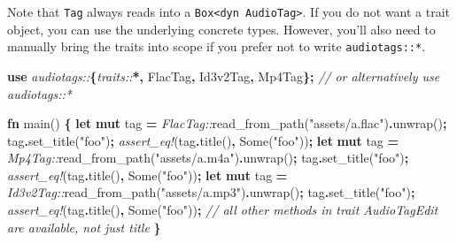 \documentclass[
]{book}
\newenvironment{Shaded}{\begin{snugshade}}{\end{snugshade}}
\newcommand{\CommentTok}[1]{\textcolor[rgb]{0.56,0.35,0.01}{\textit{#1}}}
\newcommand{\ConstantTok}[1]{\textcolor[rgb]{0.00,0.00,0.00}{#1}}
\newcommand{\KeywordTok}[1]{\textcolor[rgb]{0.13,0.29,0.53}{\textbf{#1}}}
\newcommand{\NormalTok}[1]{#1}
\newcommand{\OperatorTok}[1]{\textcolor[rgb]{0.81,0.36,0.00}{\textbf{#1}}}
\newcommand{\PreprocessorTok}[1]{\textcolor[rgb]{0.56,0.35,0.01}{\textit{#1}}}
\newcommand{\StringTok}[1]{\textcolor[rgb]{0.31,0.60,0.02}{#1}}
\begin{document}
Note that \texttt{Tag} always reads into a \texttt{Box\textless{}dyn\ AudioTag\textgreater{}}. If you do not want a trait object, you can use the underlying concrete types. However, you'll also need to manually bring the traits into scope if you prefer not to write \texttt{audiotags::*}.

\begin{Shaded}
\begin{Highlighting}[]
\KeywordTok{use} \PreprocessorTok{audiotags::}\OperatorTok{\{}\PreprocessorTok{traits::}\OperatorTok{*,}\NormalTok{ FlacTag}\OperatorTok{,}\NormalTok{ Id3v2Tag}\OperatorTok{,}\NormalTok{ Mp4Tag}\OperatorTok{\};}
\CommentTok{// or alternatively \textasciigrave{}use audiotags::*\textasciigrave{}}

\KeywordTok{fn}\NormalTok{ main() }\OperatorTok{\{}
    \KeywordTok{let} \KeywordTok{mut}\NormalTok{ tag }\OperatorTok{=} \PreprocessorTok{FlacTag::}\NormalTok{read\_from\_path(}\StringTok{"assets/a.flac"}\NormalTok{)}\OperatorTok{.}\NormalTok{unwrap()}\OperatorTok{;}
\NormalTok{    tag}\OperatorTok{.}\NormalTok{set\_title(}\StringTok{"foo"}\NormalTok{)}\OperatorTok{;}
    \PreprocessorTok{assert\_eq!}\NormalTok{(tag}\OperatorTok{.}\NormalTok{title()}\OperatorTok{,} \ConstantTok{Some}\NormalTok{(}\StringTok{"foo"}\NormalTok{))}\OperatorTok{;}
    \KeywordTok{let} \KeywordTok{mut}\NormalTok{ tag }\OperatorTok{=} \PreprocessorTok{Mp4Tag::}\NormalTok{read\_from\_path(}\StringTok{"assets/a.m4a"}\NormalTok{)}\OperatorTok{.}\NormalTok{unwrap()}\OperatorTok{;}
\NormalTok{    tag}\OperatorTok{.}\NormalTok{set\_title(}\StringTok{"foo"}\NormalTok{)}\OperatorTok{;}
    \PreprocessorTok{assert\_eq!}\NormalTok{(tag}\OperatorTok{.}\NormalTok{title()}\OperatorTok{,} \ConstantTok{Some}\NormalTok{(}\StringTok{"foo"}\NormalTok{))}\OperatorTok{;}
    \KeywordTok{let} \KeywordTok{mut}\NormalTok{ tag }\OperatorTok{=} \PreprocessorTok{Id3v2Tag::}\NormalTok{read\_from\_path(}\StringTok{"assets/a.mp3"}\NormalTok{)}\OperatorTok{.}\NormalTok{unwrap()}\OperatorTok{;}
\NormalTok{    tag}\OperatorTok{.}\NormalTok{set\_title(}\StringTok{"foo"}\NormalTok{)}\OperatorTok{;}
    \PreprocessorTok{assert\_eq!}\NormalTok{(tag}\OperatorTok{.}\NormalTok{title()}\OperatorTok{,} \ConstantTok{Some}\NormalTok{(}\StringTok{"foo"}\NormalTok{))}\OperatorTok{;}
    \CommentTok{// all other methods in trait \textasciigrave{}AudioTagEdit\textasciigrave{} are available, not just title}
\OperatorTok{\}}
\end{Highlighting}
\end{Shaded}
\end{document}
